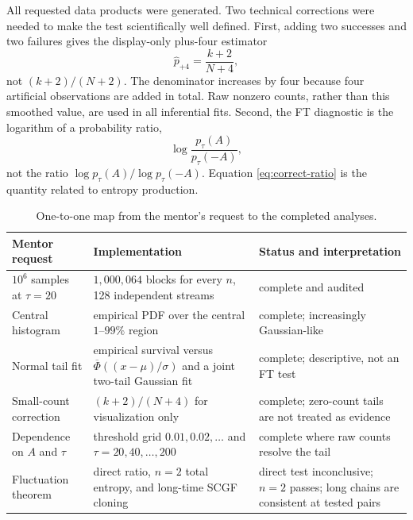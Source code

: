 \documentclass[11pt]{article}
\begin{document}
All requested data products were generated.  Two technical corrections were
needed to make the test scientifically well defined.  First, adding two
successes and two failures gives the display-only plus-four estimator
\begin{equation}
 \widehat p_{+4}=\frac{k+2}{N+4},
\end{equation}
not $(k+2)/(N+2)$.  The denominator increases by four because four artificial
observations are added in total.  Raw nonzero counts, rather than this
smoothed value, are used in all inferential fits.  Second, the FT diagnostic
is the logarithm of a probability ratio,
\begin{equation}
 \log\frac{p_\tau(A)}{p_\tau(-A)},
 \label{eq:correct-ratio}
\end{equation}
not the ratio $\log p_\tau(A)/\log p_\tau(-A)$.  Equation
\eqref{eq:correct-ratio} is the quantity related to entropy production.

\begin{table}[ht]
\centering
\small
\begin{tabularx}{\textwidth}{>{\raggedright\arraybackslash}p{}
>{\raggedright\arraybackslash}p{}
>{\raggedright\arraybackslash}X}
\toprule
Mentor request & Implementation & Status and interpretation\\
\midrule
$10^6$ samples at $\tau=20$ & $1{,}000{,}064$ blocks for every $n$, 128 independent streams & complete and audited\\
Central histogram & empirical PDF over the central $1$--$99\%$ region & complete; increasingly Gaussian-like\\
Normal tail fit & empirical survival versus $\overline\Phi((x-\mu)/\sigma)$ and a joint two-tail Gaussian fit & complete; descriptive, not an FT test\\
Small-count correction & $(k+2)/(N+4)$ for visualization only & complete; zero-count tails are not treated as evidence\\
Dependence on $A$ and $\tau$ & threshold grid $0.01,0.02,\ldots$ and $\tau=20,40,\ldots,200$ & complete where raw counts resolve the tail\\
Fluctuation theorem & direct ratio, $n=2$ total entropy, and long-time SCGF cloning & direct test inconclusive; $n=2$ passes; long chains are consistent at tested pairs\\
\bottomrule
\end{tabularx}
\caption{One-to-one map from the mentor's request to the completed analyses.}
\end{table}
\end{document}
